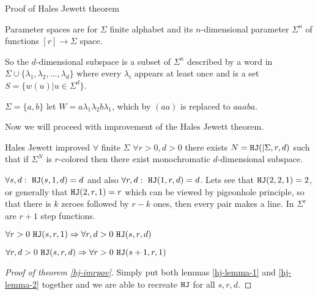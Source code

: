 \begin{topic}{Proof of Hales Jewett theorem}
	\begin{defn}
		Parameter spaces are for $\Sigma$ finite alphabet and its $n$-dimensional parameter $\Sigma^n$ of functions $[r] \to \Sigma$ space.
	\end{defn}

	So the $d$-dimensional subspace is a subset of $\Sigma^n$ described by a word in $\Sigma \cup \{\lambda_1, \lambda_2, \dots, \lambda_d\}$ where every $\lambda_i$ appears at least once and is a set $S = \{w(u) | u \in \Sigma^d\}$.
	
	\begin{example}
		$\Sigma = \{a,b\}$ let $W = a \lambda_1 \lambda_2 b \lambda_1$, which by $(aa)$ is replaced to $aaaba$.
	\end{example}

	Now we will proceed with improvement of the Hales Jewett theorem.
	
	\begin{thm}{Hales Jewett improved}
		$\forall$ finite $\Sigma$ $\forall r > 0, d > 0$ there exists $N = \mathtt{HJ}(|\Sigma, r, d)$ such that if $\Sigma^N$ is $r$-colored then there exist monochromatic $d$-dimensional subspace.
		\label{hj-imrpov}
	\end{thm}

	\begin{observ}
		$\forall s, d: \ \mathtt{HJ} (s, 1, d) = d$ and also $\forall r, d: \ \mathtt{HJ}(1, r, d) = d$. Lets see that $\mathtt{HJ}(2,2,1) = 2$, or generally that $\mathtt{HJ}(2,r,1) = r$ which can be viewed by pigeonhole principle, so that there is $k$ zeroes followed by $r - k$ ones, then every pair makes a line. In $\Sigma^r$ are $r + 1$ step functions.
	\end{observ}

	\begin{lemma}
		$\forall r > 0 \ \mathtt{HJ}(s,r,1) \Rightarrow \forall r, d > 0 \ \mathtt{HJ}(s,r,d)$
		\label{hj-lemma-1}
	\end{lemma}

	\begin{lemma}
		$\forall r, d > 0 \ \mathtt{HJ}(s,r,d) \Rightarrow \forall r > 0 \ \mathtt{HJ}(s+1, r, 1)$
		\label{hj-lemma-2}
	\end{lemma}

	\begin{proof}[Proof of theorem \ref{hj-imrpov}]
		Simply put both lemmas \ref{hj-lemma-1} and \ref{hj-lemma-2} together and we are able to recreate $\mathtt{HJ}$ for all $s, r, d$.
	\end{proof}


\end{topic}
